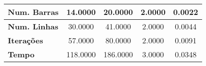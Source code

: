 \begin{tiny}\begin{tabular}{|l|c|c|c|c|}
\hline
\textbf{Num. Barras}&14.0000&20.0000&2.0000&0.0022\\\hline
\textbf{Num. Linhas}&30.0000&41.0000&2.0000&0.0044\\\hline
\textbf{Iterações}&57.0000&80.0000&2.0000&0.0091\\\hline
\textbf{Tempo}&118.0000&186.0000&3.0000&0.0348\\\hline
\end{tabular}
\end{tiny}